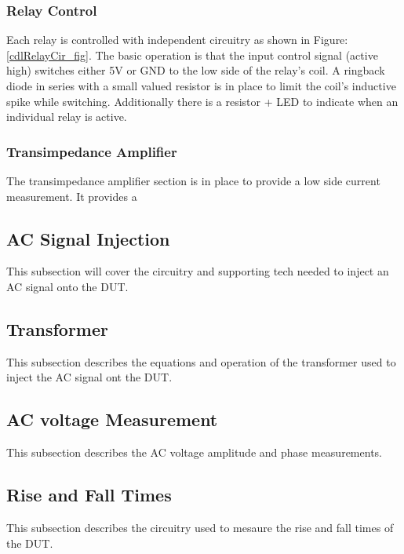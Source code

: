 \subsubsection{Relay Control}

Each relay is controlled with independent circuitry as shown in Figure: \ref{cdlRelayCir_fig}. The basic operation is that the input control signal (active high) switches either 5V or GND to the low side of the relay's coil. A ringback diode in series with a small valued resistor is in place to limit the coil's inductive spike while switching. Additionally there is a resistor + LED to indicate when an individual relay is active.

\subsubsection{Transimpedance Amplifier}
The transimpedance amplifier section is in place to provide a low side current measurement. It provides a 


\subsection {AC Signal Injection}

This subsection will cover the circuitry and supporting tech needed to inject an AC signal onto the DUT.

\subsection {Transformer}

This subsection describes the equations and operation of the transformer used to inject the AC signal ont the DUT.

\subsection {AC voltage Measurement}

This subsection describes the AC voltage amplitude and phase measurements. 

\subsection {Rise and Fall Times}

This subsection describes the circuitry used to mesaure the rise and fall times of the DUT.


